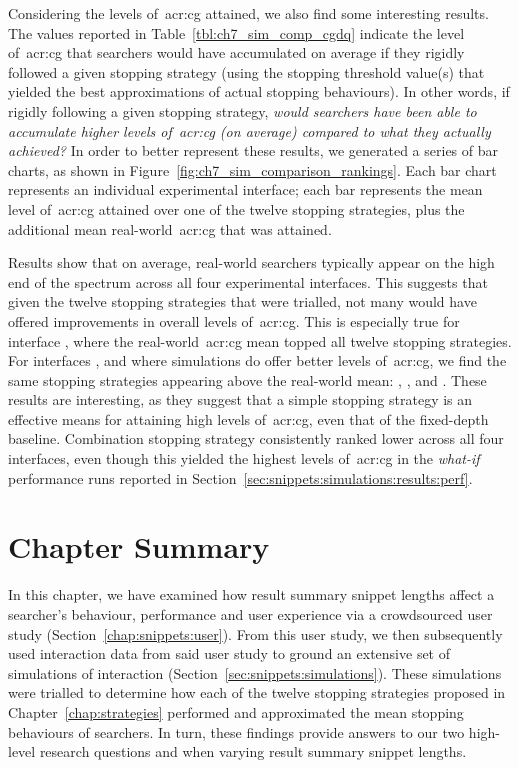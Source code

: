 Considering the levels of~\gls{acr:cg} attained, we also find some interesting results. The values reported in Table~\ref{tbl:ch7_sim_comp_cgdq} indicate the level of~\gls{acr:cg} that searchers would have accumulated on average if they rigidly followed a given stopping strategy (using the stopping threshold value(s) that yielded the best approximations of actual stopping behaviours). In other words, if rigidly following a given stopping strategy, \emph{would searchers have been able to accumulate higher levels of~\gls{acr:cg} (on average) compared to what they actually achieved?} In order to better represent these results, we generated a series of bar charts, as shown in Figure~\ref{fig:ch7_sim_comparison_rankings}. Each bar chart represents an individual experimental interface; each bar represents the mean level of~\gls{acr:cg} attained over one of the twelve stopping strategies, plus the additional mean real-world~\gls{acr:cg} that was attained.

Results show that on average, real-world searchers typically appear on the high end of the spectrum across all four experimental interfaces. This suggests that given the twelve stopping strategies that were trialled, not many would have offered improvements in overall levels of~\gls{acr:cg}. This is especially true for interface , where the real-world~\gls{acr:cg} mean topped all twelve stopping strategies. For interfaces ,  and  where simulations do offer better levels of~\gls{acr:cg}, we find the same stopping strategies appearing above the real-world mean: , ,  and . These results are interesting, as they suggest that a simple stopping strategy is an effective means for attaining high levels of~\gls{acr:cg}, even that of the fixed-depth baseline. Combination stopping strategy  consistently ranked lower across all four interfaces, even though this yielded the highest levels of~\gls{acr:cg} in the \emph{what-if} performance runs reported in Section~\ref{sec:snippets:simulations:results:perf}.

\section{Chapter Summary}
In this chapter, we have examined how result summary snippet lengths affect a searcher's behaviour, performance and user experience via a crowdsourced user study (Section~\ref{chap:snippets:user}). From this user study, we then subsequently used interaction data from said user study to ground an extensive set of simulations of interaction (Section~\ref{sec:snippets:simulations}). These simulations were trialled to determine how each of the twelve stopping strategies proposed in Chapter~\ref{chap:strategies} performed and approximated the mean stopping behaviours of searchers. In turn, these findings provide answers to our two high-level research questions  and  when varying result summary snippet lengths.

